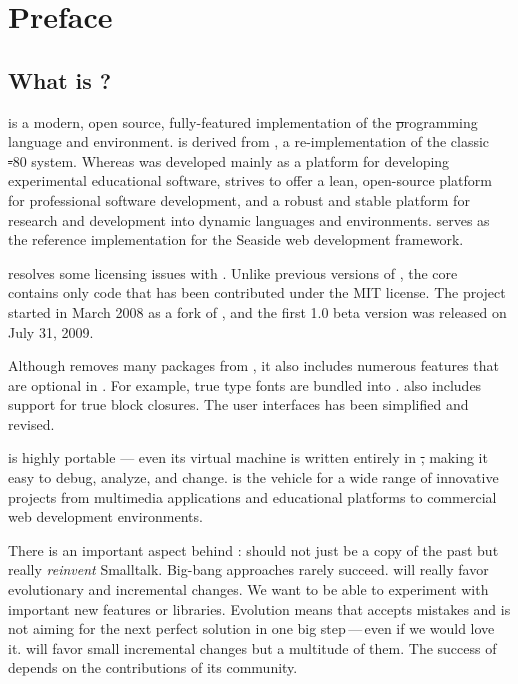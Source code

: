 \documentclass[a4paper,10pt,twoside]{book}
\begin{document}
	\sloppy
	\frontmatter
\fi
\chapter{Preface}

\section*{What is \pharo?}

\pharo is a modern, open source, fully-featured implementation of the \st programming language and environment. \pharo is derived from \squeak\cite{Inga97a}, a re-implementation of the classic \st-80 system. Whereas \squeak was developed mainly as a platform for developing experimental educational software, \pharo strives to offer a lean, open-source platform for professional software development, and a robust and stable platform for research and development into dynamic languages and environments. \pharo serves as the reference implementation for the Seaside web development framework.

\pharo resolves some licensing issues with \squeak. Unlike previous versions of \squeak, the \pharo core contains only code that has been contributed under the MIT license. The \pharo project started in March 2008 as a fork of , and the first 1.0 beta version was released on July 31, 2009.

Although \pharo removes many packages from \squeak, it also includes numerous features that are optional in \squeak. For example, true type fonts are bundled into \pharo. \pharo also includes support for true block closures. The user interfaces has been simplified and revised.

\pharo is highly portable --- even its virtual machine is written entirely in \st, making it easy to debug, analyze, and change. \pharo is the vehicle for a wide range of innovative projects from multimedia applications and educational platforms to commercial web development environments. 

There is an important aspect behind \pharo: \pharo should not just be a copy of the past but really \emph{reinvent} Smalltalk. Big-bang approaches rarely succeed. \pharo will really favor evolutionary and incremental changes. We want to be able to experiment with important new features or libraries. Evolution means that \pharo accepts mistakes and is not aiming for the next perfect solution in one big step\,---\,even if we would love it. \pharo will favor small incremental changes but a multitude of them. The success of \pharo depends on the contributions of its community.
\end{document}
